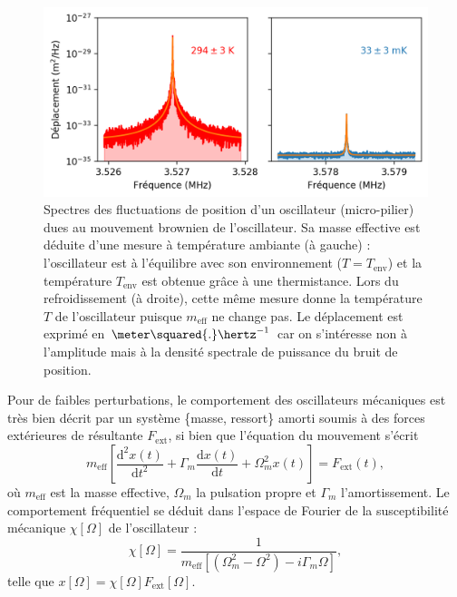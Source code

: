 \documentclass[12pt,a4paper]{article}
\renewcommand{\d}{\mathrm{d}}
\begin{document}
\begin{figure}
\center
\includegraphics[scale=0.75]{figures/thermal_peak_def_filled.png}
\caption{Spectres des fluctuations de position d'un oscillateur (micro-pilier) dues au mouvement brownien de l'oscillateur.
Sa masse effective est déduite d'une mesure à température ambiante (à gauche) : l'oscillateur est à l'équilibre avec son environnement ($T=T_\mathrm{env}$) et la température $T_\mathrm{env}$ est obtenue grâce à une thermistance.
Lors du refroidissement (à droite), cette même mesure donne la température $T$ de l'oscillateur puisque $m_\mathrm{eff}$ ne change pas. 
Le déplacement est exprimé en $\meter\squared{.}\hertz^{-1}$ car on s'intéresse non à l'amplitude mais à la densité spectrale de puissance du bruit de position.}
\label{fig:thermal_noise}
\end{figure}

Pour de faibles perturbations, le comportement des oscillateurs mécaniques est très bien décrit par un système \{masse, ressort\} amorti soumis à des forces extérieures de résultante $F_\mathrm{ext}$, si bien que l'équation du mouvement s'écrit
\begin{equation}
m_\mathrm{eff}\left[\frac{\d ^2 x(t)}{\d t^2} + \Gamma_m \frac{\d  x(t)}{\d t} +  \Omega_m^2 x(t)\right] = F_\mathrm{ext}(t),
\label{eq:eq_of_motion}
\end{equation}
où $m_\mathrm{eff}$ est la masse effective, $\Omega_m$ la pulsation propre et $\Gamma_m$ l'amortissement.
Le comportement fréquentiel se déduit dans l'espace de Fourier de la susceptibilité mécanique $\chi[\Omega]$ de l'oscillateur :
\begin{equation}
\chi[\Omega] = \frac{1}{m_\mathrm{eff}[(\Omega_m^2-\Omega^2)-i\Gamma_m\Omega]},
\end{equation}
telle que $x[\Omega] = \chi[\Omega]F_\mathrm{ext}[\Omega]$.
\end{document}
